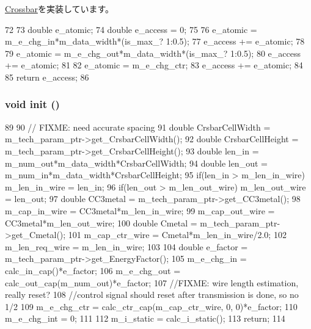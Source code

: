 \hyperlink{classCrossbar_ac2104354778bb800a8854b9386a66fbe}{Crossbar}を実装しています。


\begin{DoxyCode}
72 {
73     double e_atomic;
74     double e_access = 0;
75 
76     e_atomic = m_e_chg_in*m_data_width*(is_max_? 1:0.5);
77     e_access += e_atomic;
78 
79     e_atomic = m_e_chg_out*m_data_width*(is_max_? 1:0.5);
80     e_access += e_atomic;
81 
82     e_atomic = m_e_chg_ctr;
83     e_access += e_atomic;
84 
85     return e_access;
86 }
\end{DoxyCode}
\hypertarget{classMatrixCrossbar_a02fd73d861ef2e4aabb38c0c9ff82947}{
\subsubsection[{init}]{\setlength{\rightskip}{0pt plus 5cm}void init ()}}
\label{classMatrixCrossbar_a02fd73d861ef2e4aabb38c0c9ff82947}



\begin{DoxyCode}
89 {
90     // FIXME: need accurate spacing
91     double CrsbarCellWidth = m_tech_param_ptr->get_CrsbarCellWidth();
92     double CrsbarCellHeight = m_tech_param_ptr->get_CrsbarCellHeight();
93     double len_in = m_num_out*m_data_width*CrsbarCellWidth;
94     double len_out = m_num_in*m_data_width*CrsbarCellHeight;
95     if(len_in > m_len_in_wire) m_len_in_wire = len_in;
96     if(len_out > m_len_out_wire) m_len_out_wire = len_out;
97     double CC3metal = m_tech_param_ptr->get_CC3metal();
98     m_cap_in_wire = CC3metal*m_len_in_wire;
99     m_cap_out_wire = CC3metal*m_len_out_wire;
100     double Cmetal = m_tech_param_ptr->get_Cmetal();
101     m_cap_ctr_wire = Cmetal*m_len_in_wire/2.0;
102     m_len_req_wire = m_len_in_wire;
103 
104     double e_factor = m_tech_param_ptr->get_EnergyFactor();
105     m_e_chg_in = calc_in_cap()*e_factor;
106     m_e_chg_out = calc_out_cap(m_num_out)*e_factor;
107     //FIXME: wire length estimation, really reset?
108     //control signal should reset after transmission is done, so no 1/2
109     m_e_chg_ctr = calc_ctr_cap(m_cap_ctr_wire, 0, 0)*e_factor;
110     m_e_chg_int = 0;
111 
112     m_i_static = calc_i_static();
113     return;
114 }
\end{DoxyCode}


